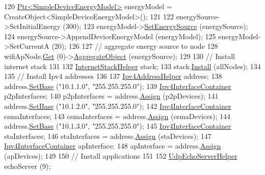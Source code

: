 \begin{DoxyCode}
120   \hyperlink{classns3_1_1Ptr}{Ptr<SimpleDeviceEnergyModel>} energyModel = 
      CreateObject<SimpleDeviceEnergyModel>();
121 
122   energySource->SetInitialEnergy (300);
123   energyModel->\hyperlink{classns3_1_1SimpleDeviceEnergyModel_adccfb18951ab328e076662a2cedd2340}{SetEnergySource} (energySource);
124   energySource->AppendDeviceEnergyModel (energyModel);
125   energyModel->SetCurrentA (20);
126 
127   \textcolor{comment}{// aggregate energy source to node}
128   wifiApNode.\hyperlink{classns3_1_1NodeContainer_a9ed96e2ecc22e0f5a3d4842eb9bf90bf}{Get} (0)->\hyperlink{classns3_1_1Object_a79dd435d300f3deca814553f561a2922}{AggregateObject} (energySource);
129 
130   \textcolor{comment}{// Install internet stack}
131 
132   \hyperlink{classns3_1_1InternetStackHelper}{InternetStackHelper} stack;
133   stack.\hyperlink{classns3_1_1InternetStackHelper_a6645b412f31283d2d9bc3d8a95cebbc0}{Install} (allNodes);
134 
135   \textcolor{comment}{// Install Ipv4 addresses}
136 
137   \hyperlink{classns3_1_1Ipv4AddressHelper}{Ipv4AddressHelper} address;
138   address.\hyperlink{classns3_1_1Ipv4AddressHelper_acf7b16dd25bac67e00f5e25f90a9a035}{SetBase} (\textcolor{stringliteral}{"10.1.1.0"}, \textcolor{stringliteral}{"255.255.255.0"});
139   \hyperlink{classns3_1_1Ipv4InterfaceContainer}{Ipv4InterfaceContainer} p2pInterfaces;
140   p2pInterfaces = address.\hyperlink{classns3_1_1Ipv4AddressHelper_af8e7f4a1a7e74c00014a1eac445a27af}{Assign} (p2pDevices);
141   address.\hyperlink{classns3_1_1Ipv4AddressHelper_acf7b16dd25bac67e00f5e25f90a9a035}{SetBase} (\textcolor{stringliteral}{"10.1.2.0"}, \textcolor{stringliteral}{"255.255.255.0"});
142   \hyperlink{classns3_1_1Ipv4InterfaceContainer}{Ipv4InterfaceContainer} csmaInterfaces;
143   csmaInterfaces = address.\hyperlink{classns3_1_1Ipv4AddressHelper_af8e7f4a1a7e74c00014a1eac445a27af}{Assign} (csmaDevices);
144   address.\hyperlink{classns3_1_1Ipv4AddressHelper_acf7b16dd25bac67e00f5e25f90a9a035}{SetBase} (\textcolor{stringliteral}{"10.1.3.0"}, \textcolor{stringliteral}{"255.255.255.0"});
145   \hyperlink{classns3_1_1Ipv4InterfaceContainer}{Ipv4InterfaceContainer} staInterfaces;
146   staInterfaces = address.\hyperlink{classns3_1_1Ipv4AddressHelper_af8e7f4a1a7e74c00014a1eac445a27af}{Assign} (staDevices);
147   \hyperlink{classns3_1_1Ipv4InterfaceContainer}{Ipv4InterfaceContainer} apInterface;
148   apInterface = address.\hyperlink{classns3_1_1Ipv4AddressHelper_af8e7f4a1a7e74c00014a1eac445a27af}{Assign} (apDevices);
149 
150   \textcolor{comment}{// Install applications}
151 
152   \hyperlink{classns3_1_1UdpEchoServerHelper}{UdpEchoServerHelper} echoServer (9);

\end{DoxyCode}
